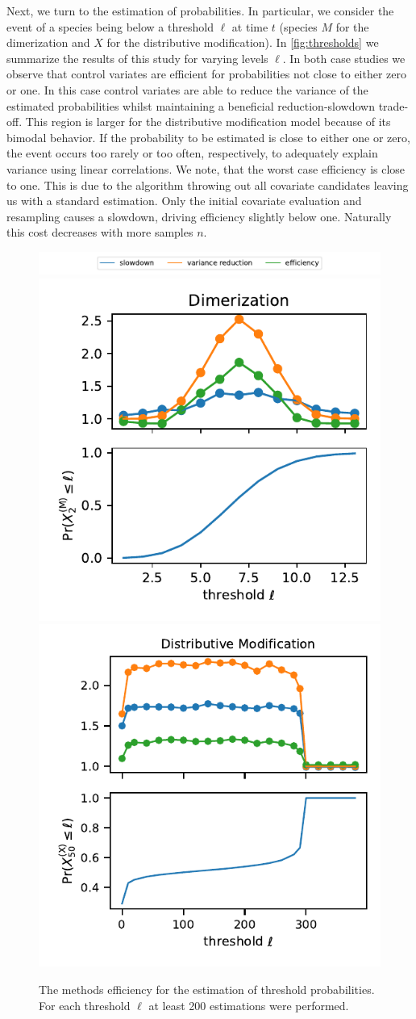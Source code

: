 Next, we turn to the estimation of probabilities.
In particular, we consider the event of a species being below a threshold $\ell$ at time $t$ (species $M$ for the dimerization and $X$ for the distributive modification).
In \autoref{fig:thresholds} we summarize the results of this study for varying levels $\ell$.
In both case studies we observe that control variates are efficient for probabilities not close to either zero or one.
In this case control variates are able to reduce the variance of the estimated probabilities whilst maintaining a beneficial reduction-slowdown trade-off.
This region is larger for the distributive modification model because of its bimodal behavior.
If the probability to be estimated is close to either one or zero, the event occurs too rarely or too often, respectively, to adequately explain variance using linear correlations.
We note, that the worst case efficiency is close to one.
This is due to the algorithm throwing out all covariate candidates leaving us with a standard estimation.
Only the initial covariate evaluation and resampling causes a slowdown, driving efficiency slightly below one.
Naturally this cost decreases with more samples $n$.
\begin{figure}[htb]
    \centering
    \includegraphics[scale=0.65]{gfx/legend_thres.pdf}\\
    \includegraphics[width=.49\textwidth]{gfx/dim_thresholds.pdf}
    \includegraphics[width=.49\textwidth]{gfx/dm_threholds.pdf}
    \caption[\ac{CV} for probabililty estimation]{The methods efficiency for the estimation of threshold probabilities. For each threshold $\ell$ at least 200 estimations were performed.}
    \label{fig:thresholds}
\end{figure}

